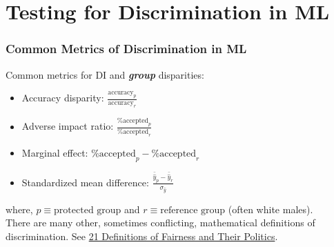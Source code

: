 \documentclass[11pt,aspectratio=169,hyperref={colorlinks}]{beamer}
\begin{document}
	\section{Testing for Discrimination in ML}

		\begin{frame}				
		
			\frametitle{Common Metrics of Discrimination in ML}
			
			Common metrics for DI and \textbf{\textit{group}} disparities:\\
			\begin{itemize}
				\item Accuracy disparity: $\frac{\text{accuracy}_p}{\text{accuracy}_r}$
				\item Adverse impact ratio: $\frac{\text{\% accepted}_p }{ \text{\% accepted}_r}$ 
				\item Marginal effect: $\text{\% accepted}_p - \text{\% accepted}_r$
				\item Standardized mean difference: $\frac{\bar{\hat{y}}_p - \bar{\hat{y}}_r}{\sigma_{\hat{y}}}$
			\end{itemize}
			\noindent 
			\scriptsize{where, $p \equiv \text{protected group}$ and $r \equiv \text{reference group}$ (often white males).}\\
			\vspace{5pt}
			\normalsize{There are many other, sometimes conflicting, mathematical definitions of discrimination. 
				See \href{https://www.youtube.com/watch?v=wqamrPkF5kk}{21 Definitions of Fairness and Their Politics}.}
			
		\end{frame}
	
\end{document}
